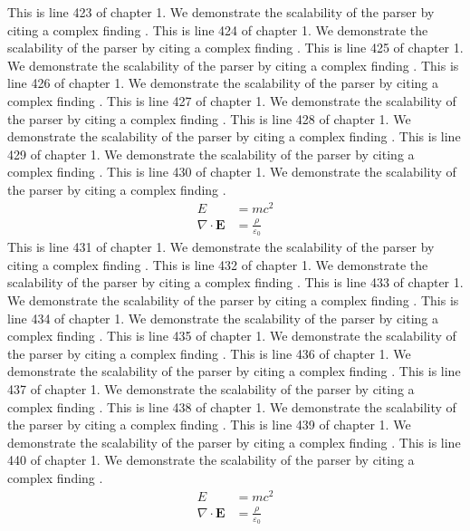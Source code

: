This is line 423 of chapter 1. We demonstrate the scalability of the parser by citing a complex finding \cite{ref1_423}.
This is line 424 of chapter 1. We demonstrate the scalability of the parser by citing a complex finding \cite{ref1_424}.
This is line 425 of chapter 1. We demonstrate the scalability of the parser by citing a complex finding \cite{ref1_425}.
This is line 426 of chapter 1. We demonstrate the scalability of the parser by citing a complex finding \cite{ref1_426}.
This is line 427 of chapter 1. We demonstrate the scalability of the parser by citing a complex finding \cite{ref1_427}.
This is line 428 of chapter 1. We demonstrate the scalability of the parser by citing a complex finding \cite{ref1_428}.
This is line 429 of chapter 1. We demonstrate the scalability of the parser by citing a complex finding \cite{ref1_429}.
This is line 430 of chapter 1. We demonstrate the scalability of the parser by citing a complex finding \cite{ref1_430}.
\begin{align*}
  E &= mc^2 \\
  \nabla \cdot \mathbf{E} &= \frac{\rho}{\varepsilon_0}
\end{align*}
This is line 431 of chapter 1. We demonstrate the scalability of the parser by citing a complex finding \cite{ref1_431}.
This is line 432 of chapter 1. We demonstrate the scalability of the parser by citing a complex finding \cite{ref1_432}.
This is line 433 of chapter 1. We demonstrate the scalability of the parser by citing a complex finding \cite{ref1_433}.
This is line 434 of chapter 1. We demonstrate the scalability of the parser by citing a complex finding \cite{ref1_434}.
This is line 435 of chapter 1. We demonstrate the scalability of the parser by citing a complex finding \cite{ref1_435}.
This is line 436 of chapter 1. We demonstrate the scalability of the parser by citing a complex finding \cite{ref1_436}.
This is line 437 of chapter 1. We demonstrate the scalability of the parser by citing a complex finding \cite{ref1_437}.
This is line 438 of chapter 1. We demonstrate the scalability of the parser by citing a complex finding \cite{ref1_438}.
This is line 439 of chapter 1. We demonstrate the scalability of the parser by citing a complex finding \cite{ref1_439}.
This is line 440 of chapter 1. We demonstrate the scalability of the parser by citing a complex finding \cite{ref1_440}.
\begin{align*}
  E &= mc^2 \\
  \nabla \cdot \mathbf{E} &= \frac{\rho}{\varepsilon_0}
\end{align*}
